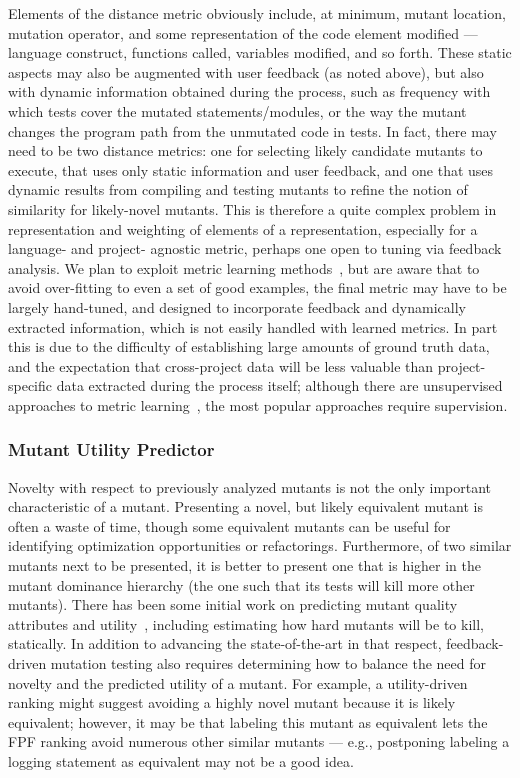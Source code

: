 Elements of the
distance metric obviously include, at minimum, mutant location, mutation operator, and
some representation of the code element modified --- language
construct, functions called, variables modified, and so forth.  These
static aspects may also be augmented with user feedback (as noted
above), but also with dynamic information obtained during the process,
such as frequency with which tests cover the mutated
statements/modules, or the way the mutant changes the
program path from the unmutated code in tests.  In fact, there may
need to be two distance metrics:  one for selecting likely candidate
mutants to execute, that uses only static information and user
feedback, and one that uses dynamic results from compiling and testing
mutants to refine the notion of similarity for likely-novel mutants.
This is therefore a quite complex problem in representation and weighting of elements of a
representation, especially for a language- and
project- agnostic metric, perhaps one open to tuning via feedback
analysis.  We plan to exploit metric learning
methods~\cite{kulis2012metric}, but are aware that to avoid over-fitting
to even a set of good examples, the final metric may have to be largely
hand-tuned, and designed to incorporate feedback and dynamically
extracted information, which is not easily handled with learned metrics.  In part this is due to the difficulty of establishing
large amounts of ground truth data, and the expectation that
cross-project data will be less valuable than project-specific data
extracted during the process itself; although there are unsupervised
approaches to metric learning~\cite{scholkopf1998nonlinear,tipping1999probabilistic}, the most popular approaches require supervision.

\subsubsection{Mutant Utility Predictor}

Novelty with respect to previously analyzed mutants is not the only
important characteristic of a mutant.  Presenting a novel, but likely
equivalent mutant is often a waste of time, though some equivalent
mutants can be useful for identifying optimization opportunities or
refactorings.  Furthermore, of two similar mutants next to be presented,
it is better to present one that is higher in the mutant dominance
hierarchy (the one such that its tests will kill more other mutants).
There has been some initial work on predicting mutant quality
attributes and utility~\cite{MutQuality,FaRM}, including estimating how hard mutants
will be to kill, statically.  In addition to advancing the
state-of-the-art in that respect, feedback-driven mutation testing
also requires determining how to balance the need for novelty and the
predicted utility of a mutant.  For example, a utility-driven ranking
might suggest avoiding a highly novel mutant because it is likely
equivalent; however, it may be that labeling this mutant as equivalent
lets the FPF ranking avoid numerous other similar mutants --- e.g.,
postponing labeling a logging statement as equivalent may not be a
good idea.

